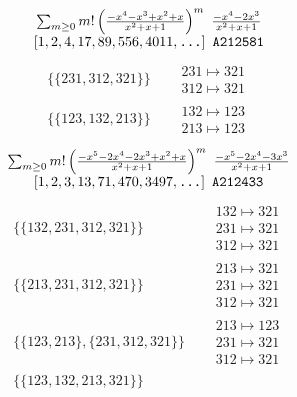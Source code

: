 \begin{tiny}
\begin{align}
\begin{matrix}
\end{matrix}
\end{align}
$$
\begin{matrix}
\sum_{m \geq 0} m! \left(
\frac{-x^{4} - x^{3} + x^{2} + x}{x^{2} + x + 1}
\right)^m
\ 
\frac{-x^{4} - 2 x^{3}}{x^{2} + x + 1}
\\
\left[1, 2, 4, 17, 89, 556, 4011, \text{\texttt{...}}\right]
\ 
\texttt{A212581}
\end{matrix}
$$
\vspace{-1em}
\begin{align}
\{\{231, 312, 321\}\}
\quad
&
\begin{matrix}
231 \mapsto 321\\312 \mapsto 321
\end{matrix}
\\
\{\{123, 132, 213\}\}
\quad
&
\begin{matrix}
132 \mapsto 123\\213 \mapsto 123
\end{matrix}
\end{align}
$$
\begin{matrix}
\sum_{m \geq 0} m! \left(
\frac{-x^{5} - 2 x^{4} - 2 x^{3} + x^{2} + x}{x^{2} + x + 1}
\right)^m
\ 
\frac{-x^{5} - 2 x^{4} - 3 x^{3}}{x^{2} + x + 1}
\\
\left[1, 2, 3, 13, 71, 470, 3497, \text{\texttt{...}}\right]
\ 
\texttt{A212433}
\end{matrix}
$$
\vspace{-1em}
\begin{align}
\{\{132, 231, 312, 321\}\}
\quad
&
\begin{matrix}
132 \mapsto 321\\231 \mapsto 321\\312 \mapsto 321
\end{matrix}
\\
\{\{213, 231, 312, 321\}\}
\quad
&
\begin{matrix}
213 \mapsto 321\\231 \mapsto 321\\312 \mapsto 321
\end{matrix}
\\
\{\{123, 213\}, \{231, 312, 321\}\}
\quad
&
\begin{matrix}
213 \mapsto 123\\231 \mapsto 321\\312 \mapsto 321
\end{matrix}
\\
\{\{123, 132, 213, 321\}\}
\quad
&
\begin{matrix}

\end{matrix}
\end{align}
\end{tiny}
